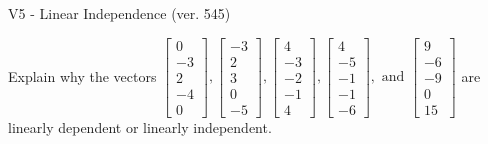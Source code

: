 \begin{exercise}
  \begin{exerciseTitle}V5 - Linear Independence (ver. 545)\end{exerciseTitle}
  \begin{exerciseStatement}
    Explain why the vectors \(\left[\begin{array}{r}
0 \\
-3 \\
2 \\
-4 \\
0
\end{array}\right] , \left[\begin{array}{r}
-3 \\
2 \\
3 \\
0 \\
-5
\end{array}\right] , \left[\begin{array}{r}
4 \\
-3 \\
-2 \\
-1 \\
4
\end{array}\right] , \left[\begin{array}{r}
4 \\
-5 \\
-1 \\
-1 \\
-6
\end{array}\right] , \text{ and } \left[\begin{array}{r}
9 \\
-6 \\
-9 \\
0 \\
15
\end{array}\right]\) are linearly dependent or linearly independent.	



\end{exerciseStatement}
\end{exercise}
